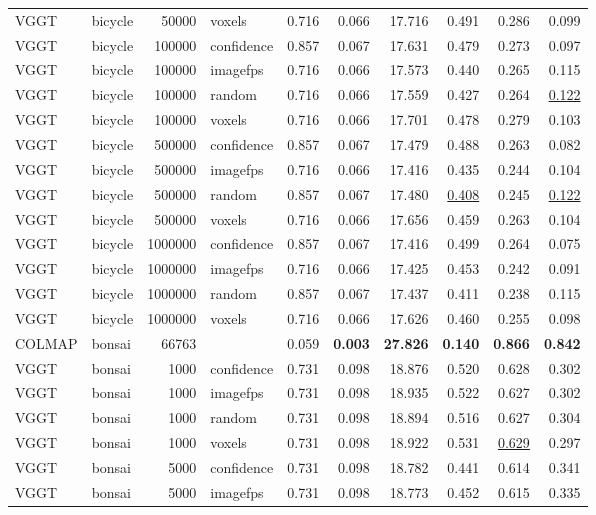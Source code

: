 \begin{table}[H]
\begin{tabular}{llrlrrrrrr}
VGGT & bicycle & 50000 & voxels & 0.716 & 0.066 & 17.716 & 0.491 & 0.286 & 0.099 \\
VGGT & bicycle & 100000 & confidence & 0.857 & 0.067 & 17.631 & 0.479 & 0.273 & 0.097 \\
VGGT & bicycle & 100000 & imagefps & 0.716 & 0.066 & 17.573 & 0.440 & 0.265 & 0.115 \\
VGGT & bicycle & 100000 & random & 0.716 & 0.066 & 17.559 & 0.427 & 0.264 & \underline{0.122} \\
VGGT & bicycle & 100000 & voxels & 0.716 & 0.066 & 17.701 & 0.478 & 0.279 & 0.103 \\
VGGT & bicycle & 500000 & confidence & 0.857 & 0.067 & 17.479 & 0.488 & 0.263 & 0.082 \\
VGGT & bicycle & 500000 & imagefps & 0.716 & 0.066 & 17.416 & 0.435 & 0.244 & 0.104 \\
VGGT & bicycle & 500000 & random & 0.857 & 0.067 & 17.480 & \underline{0.408} & 0.245 & \underline{0.122} \\
VGGT & bicycle & 500000 & voxels & 0.716 & 0.066 & 17.656 & 0.459 & 0.263 & 0.104 \\
VGGT & bicycle & 1000000 & confidence & 0.857 & 0.067 & 17.416 & 0.499 & 0.264 & 0.075 \\
VGGT & bicycle & 1000000 & imagefps & 0.716 & 0.066 & 17.425 & 0.453 & 0.242 & 0.091 \\
VGGT & bicycle & 1000000 & random & 0.857 & 0.067 & 17.437 & 0.411 & 0.238 & 0.115 \\
VGGT & bicycle & 1000000 & voxels & 0.716 & 0.066 & 17.626 & 0.460 & 0.255 & 0.098 \\
\midrule
COLMAP & bonsai & 66763 &  & 0.059 & \textbf{0.003} & \textbf{27.826} & \textbf{0.140} & \textbf{0.866} & \textbf{0.842} \\
VGGT & bonsai & 1000 & confidence & 0.731 & 0.098 & 18.876 & 0.520 & 0.628 & 0.302 \\
VGGT & bonsai & 1000 & imagefps & 0.731 & 0.098 & 18.935 & 0.522 & 0.627 & 0.302 \\
VGGT & bonsai & 1000 & random & 0.731 & 0.098 & 18.894 & 0.516 & 0.627 & 0.304 \\
VGGT & bonsai & 1000 & voxels & 0.731 & 0.098 & 18.922 & 0.531 & \underline{0.629} & 0.297 \\
VGGT & bonsai & 5000 & confidence & 0.731 & 0.098 & 18.782 & 0.441 & 0.614 & 0.341 \\
VGGT & bonsai & 5000 & imagefps & 0.731 & 0.098 & 18.773 & 0.452 & 0.615 & 0.335 \\

\end{tabular}
\end{table}
